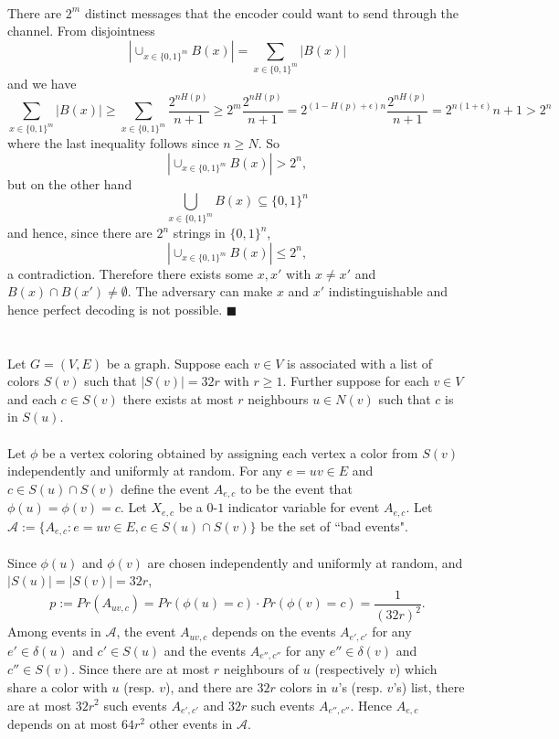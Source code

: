 \documentclass[letterpaper,12pt,oneside,onecolumn]{article}
\newcommand{\cA}{\mathcal{A}} \newcommand{\cB}{\mathcal{B}}
\begin{document}
\paragraph{}
There are $2^m$ distinct messages that the encoder could want to send through the channel. 
From disjointness
$$|\cup_{x\in\{0,1\}^m}B(x)| = \sum_{x \in \{0,1\}^m}|B(x)|$$
and we have
$$\sum_{x \in \{0,1\}^m}|B(x)| \geq \sum_{x\in\{0,1\}^m}\frac{2^{nH(p)}}{n+1} \geq 2^m\frac{2^{nH(p)}}{n+1} = 2^{(1-H(p)+\epsilon)n}\frac{2^{nH(p)}}{n+1} = 2^{n(1+\epsilon)}{n+1} > 2^n$$
where the last inequality follows since $n \geq N$. So
$$ |\cup_{x\in\{0,1\}^m}B(x)| >2^n,$$
but on the other hand
$$\bigcup_{x\in\{0,1\}^m}B(x) \subseteq \{0,1\}^n$$
and hence, since there are $2^n$ strings in $\{0,1\}^n$, 
$$|\cup_{x\in\{0,1\}^m}B(x)| \leq 2^n,$$
a contradiction. Therefore there exists some $x,x'$ with $x\neq x'$ and $B(x) \cap B(x') \neq \emptyset$. The adversary can make $x$ and $x'$ indistinguishable and hence perfect decoding is not possible. $\blacksquare$
\newpage
\section{}
\paragraph{}
Let $G = (V,E)$ be a graph. Suppose each $v \in V$ is associated with a list of colors $S(v)$ such that $|S(v)| = 32r$ with $r\geq 1$. Further suppose for each $v \in V$ and each $c \in S(v)$ there exists at most $r$ neighbours $u \in N(v)$ such that $c$ is in $S(u)$.
\paragraph{}
Let $\phi$ be a vertex coloring obtained by assigning each vertex a color from $S(v)$ independently and uniformly at random. For any $e=uv \in E$ and $c \in S(u) \cap S(v)$ define the event $A_{e,c}$ to be the event that $\phi(u) = \phi(v) = c$. Let $X_{e,c}$ be a $0$-$1$ indicator variable for event $A_{e,c}$. Let $\cA := \{A_{e,c} : e=uv \in E, c \in S(u) \cap S(v)\}$ be the set of ``bad events".
\paragraph{}
Since $\phi(u)$ and $\phi(v)$ are chosen independently and uniformly at random, and $|S(u)| = |S(v)| = 32r$,
$$p := Pr(A_{uv,c}) = Pr(\phi(u)=c)\cdot Pr(\phi(v)=c) = \frac{1}{(32r)^2}.$$
Among events in $\cA$, the event $A_{uv,c}$ depends on the events $A_{e', c'}$ for any $e' \in \delta(u)$ and $c' \in S(u)$ and the events $A_{e'', c''}$ for any $e'' \in \delta(v)$ and $c'' \in S(v)$. Since there are at most $r$ neighbours of $u$ (respectively $v$) which share a color with $u$ (resp. $v$), and there are $32r$ colors in $u$'s (resp. $v$'s) list, there are at most $32r^2$ such events $A_{e',c'}$ and $32r$ such events $A_{e'',c''}$. Hence $A_{e,c}$ depends on at most $64r^2$ other events in $\cA$. 
\end{document}

